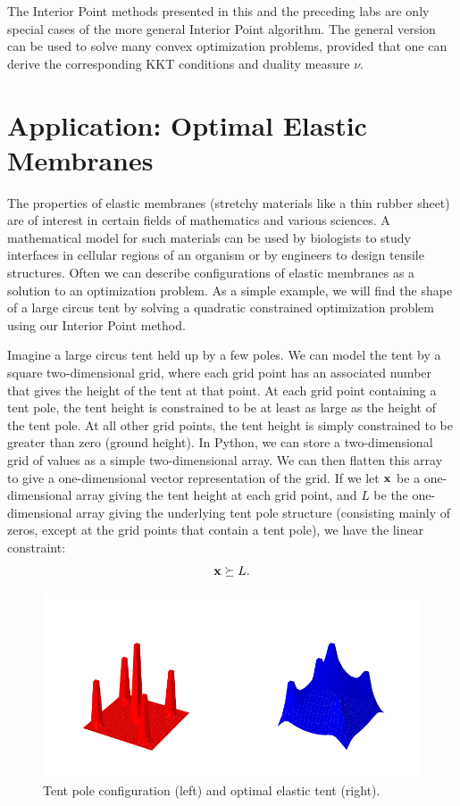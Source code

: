 \begin{info}
The Interior Point methods presented in this and the preceding labs are only special cases of the more general Interior Point algorithm.
The general version can be used to solve many convex optimization problems, provided that one can derive the corresponding KKT conditions and duality measure $\nu$.
\end{info}

\section*{Application: Optimal Elastic Membranes}
The properties of elastic membranes (stretchy materials like a thin rubber sheet) are of interest in certain fields of mathematics and various sciences.
A mathematical model for such materials can be used by biologists to study interfaces in cellular regions of an organism or by engineers to design tensile structures.
Often we can describe configurations of elastic membranes as a solution to an
optimization problem.
As a simple example, we will find the shape of a large circus tent by solving a quadratic constrained optimization problem using our Interior Point method.

Imagine a large circus tent held up by a few poles.
We can model the tent by a square two-dimensional grid, where each grid point has an associated number that gives the height of the tent at that point.
At each grid point containing a tent pole, the tent height is constrained to be at least as large as the height of the tent pole.
At all other grid points, the tent height is simply constrained to be greater than zero (ground height).
In Python, we can store a two-dimensional grid of values as a simple two-dimensional array.
We can then flatten this array to give a one-dimensional vector representation of the grid.
If we let $\mathbf{x}$ be a one-dimensional array giving the tent height at each grid point, and $L$ be the one-dimensional array giving the underlying tent pole structure (consisting mainly of zeros, except at the grid points that contain a tent pole), we have the linear constraint: \[\mathbf{x} \succeq L.\]

\begin{figure}
\includegraphics[width=\textwidth]{figures/tent.pdf}
\caption{Tent pole configuration (left) and optimal elastic tent (right).}
\label{fig:tent}
\end{figure}

